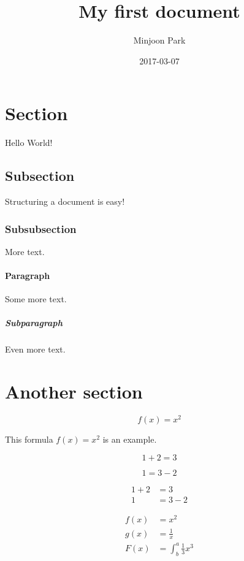 \documentclass{article}
\title{My first document}
\date{2017-03-07}
\author{Minjoon Park}
\begin{document}
  \maketitle
  \newpage

\section{Section}

Hello World!

\subsection{Subsection}

Structuring a document is easy!

\subsubsection{Subsubsection}

More text.

\paragraph{Paragraph}

Some more text.

\subparagraph{Subparagraph}

Even more text.

\section{Another section}

\begin{equation}
  f(x) = x^2
\end{equation}

This formula $f(x) = x^2$ is an example.

\begin{equation*}
  1 + 2 = 3
\end{equation*}

\begin{equation*}
  1 = 3 - 2
\end{equation*}

\begin{align*}
  1 + 2 &= 3\\
  1 &= 3 - 2
\end{align*}

\begin{align*}
  f(x) &= x^2\\
  g(x) &= \frac{1}{x}\\
  F(x) &= \int^a_b \frac{1}{3}x^3
\end{align*}
\end{document}
